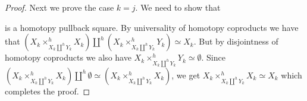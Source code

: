 \begin{corollary}
\begin{proof}
        Next we prove the case $k=j$.
        We need to show that
        \begin{center}
        \end{center}
        is a homotopy pullback square.
        By universality of homotopy coproducts we have that $\left(X_k\times_{X_k\coprod\limits^h Y_k}^h X_k\right)\coprod\limits^h\left(X_k\times_{X_k\coprod\limits^h Y_k}^hY_k\right)\simeq X_k$.
        But by disjointness of homotopy coproducts we also have $X_k\times_{X_k\coprod\limits^h Y_k}^hY_k\simeq\emptyset$.
        Since $\left(X_k\times_{X_k\coprod\limits^h Y_k}^h X_k\right)\coprod\limits^h\emptyset\simeq\left(X_k\times_{X_k\coprod\limits^h Y_k}^hX_k\right)$, we get $X_k\times_{X_k\coprod\limits^h Y_k}^hX_k\simeq X_k$ which completes the proof.
    \end{proof}
\end{corollary}
